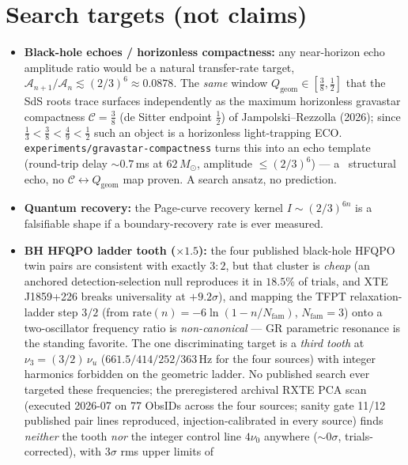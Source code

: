 \documentclass[11pt,a4paper]{article}
\begin{document}
\section{Search targets (not claims)}
\begin{gapbox}
\begin{itemize}\setlength\itemsep{2pt}
\item \textbf{Black-hole echoes / horizonless compactness:} any near-horizon echo amplitude ratio would be
a natural transfer-rate target, $\mathcal A_{n+1}/\mathcal A_n\lesssim(2/3)^6\approx0.0878$. The \emph{same}
window $Q_{\mathrm{geom}}\in[\tfrac38,\tfrac12]$ that the SdS roots trace surfaces independently as the
maximum horizonless gravastar compactness $\mathcal C=\tfrac38$ (de Sitter endpoint $\tfrac12$) of
Jampolski--Rezzolla (2026); since $\tfrac13<\tfrac38<\tfrac49<\tfrac12$ such an object is a horizonless
light-trapping ECO. \texttt{experiments/gravastar-compactness} turns this into an echo template (round-trip
delay $\sim0.7$\,ms at $62\,M_\odot$, amplitude $\le(2/3)^6$) --- a \mC\ structural echo, no
$\mathcal C\!\leftrightarrow\!Q_{\mathrm{geom}}$ map proven. A search ansatz, no prediction.
\item \textbf{Quantum recovery:} the Page-curve recovery kernel $I\sim(2/3)^{6n}$ is a falsifiable shape
if a boundary-recovery rate is ever measured.
\item \textbf{BH HFQPO ladder tooth ($\times1.5$):} the four published black-hole HFQPO twin pairs are
consistent with exactly $3{:}2$, but that cluster is \emph{cheap} (an anchored detection-selection null
reproduces it in $18.5\%$ of trials, and XTE J1859+226 breaks universality at $+9.2\sigma$), and mapping the
TFPT relaxation-ladder step $3/2$ (from $\mathrm{rate}(n)=-6\ln(1-n/N_{\mathrm{fam}})$, $N_{\mathrm{fam}}=3$)
onto a two-oscillator frequency ratio is \emph{non-canonical} --- GR parametric resonance is the standing
favorite. The one discriminating target is a \emph{third tooth} at $\nu_3=(3/2)\,\nu_u$
($661.5/414/252/363$\,Hz for the four sources) with integer harmonics forbidden on the geometric ladder.
No published search ever targeted these frequencies; the preregistered archival RXTE PCA scan (executed
2026-07 on 77 ObsIDs across the four sources; sanity gate 11/12 published pair lines reproduced,
injection-calibrated in every source) finds \emph{neither} the tooth \emph{nor} the integer control line
$4\nu_0$ anywhere ($\sim\!0\sigma$, trials-corrected), with $3\sigma$ rms upper limits of

\end{itemize}
\end{gapbox}
\end{document}
